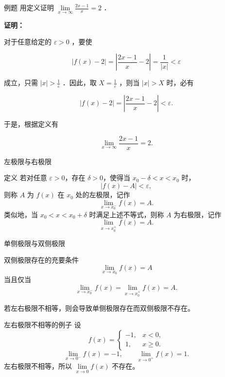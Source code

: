 \documentclass[aspectratio=169,10pt]{ctexbeamer}
\begin{document}
\begin{frame}{}
	\begin{block}{例题}
		用定义证明 $\lim\limits _{x \rightarrow \infty} \frac{2 x-1}{x}=2$ ．
		
	\end{block}
	
	\pause
	
	
	\vspace{0.3cm}
	
	\textbf{证明：}
	
	对于任意给定的 $\varepsilon>0$ ，要使
	
	$$
	|f(x)-2|=\left|\frac{2 x-1}{x}-2\right|=\frac{1}{|x|}<\varepsilon
	$$
	
	成立，只需 $|x|>\frac{1}{\varepsilon}$ ．因此，取 $X=\frac{1}{\varepsilon}$ ，则当 $|x|>X$ 时，必有
	
	$$
	|f(x)-2|=\left|\frac{2 x-1}{x}-2\right|<\varepsilon .
	$$
	
	于是，根据定义有
	
	$$
	\lim\limits _{x \rightarrow \infty} \frac{2 x-1}{x}=2 .
	$$
\end{frame}



\begin{frame}{左极限与右极限}
	\begin{block}{定义}
		若对任意 \(\varepsilon>0\)，存在 \(\delta>0\)，使得当 \(x_0-\delta<x<x_0\) 时，
		\[
		|f(x)-A|<\varepsilon,
		\]
		则称 \(A\) 为 \(f(x)\) 在 \(x_0\) 处的左极限，记作
		\[
		\lim\limits_{x\to x_0^-}f(x)=A.
		\]
		类似地，当 \(x_0<x<x_0+\delta\) 时满足上述不等式，则称 \(A\) 为右极限，记作
		\[
		\lim\limits_{x\to x_0^+}f(x)=A.
		\]
	\end{block}
\end{frame}

\begin{frame}{单侧极限与双侧极限}
	\footnotesize
	\begin{block}{双侧极限存在的充要条件}
		\[
		\lim\limits_{x\to x_0}f(x)=A
		\]
		当且仅当
		\[
		\lim\limits_{x\to x_0^-}f(x)=\lim\limits_{x\to x_0^+}f(x)=A.
		\]
	\end{block}
	若左右极限不相等，则会导致单侧极限存在而双侧极限不存在。
	
	\begin{block}{左右极限不相等的例子}
		设
		\[
		f(x)=
		\begin{cases}
			-1,&x<0,\\
			1,&x\geq0.
		\end{cases}
		\]
		\[
		\lim\limits_{x\to0^-}f(x)=-1,\qquad
		\lim\limits_{x\to0^+}f(x)=1.
		\]
		左右极限不相等，所以 \(\lim\limits_{x\to0}f(x)\) 不存在。
	\end{block}
\end{frame}
\end{document}
